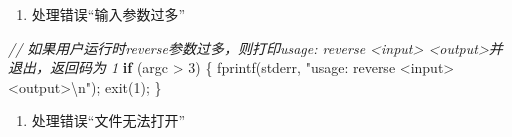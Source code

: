 \documentclass[
]{article}
\newenvironment{Shaded}{}{}
\newcommand{\CommentTok}[1]{\textcolor[rgb]{0.38,0.63,0.69}{\textit{#1}}}
\newcommand{\ControlFlowTok}[1]{\textcolor[rgb]{0.00,0.44,0.13}{\textbf{#1}}}
\newcommand{\DecValTok}[1]{\textcolor[rgb]{0.25,0.63,0.44}{#1}}
\newcommand{\NormalTok}[1]{#1}
\newcommand{\OperatorTok}[1]{\textcolor[rgb]{0.40,0.40,0.40}{#1}}
\newcommand{\SpecialCharTok}[1]{\textcolor[rgb]{0.25,0.44,0.63}{#1}}
\newcommand{\StringTok}[1]{\textcolor[rgb]{0.25,0.44,0.63}{#1}}
\begin{document}
\begin{enumerate}
	\def\labelenumi{\arabic{enumi}.}
	\item
	      处理错误``输入参数过多''
\end{enumerate}

\begin{Shaded}
	\begin{Highlighting}[]
		\CommentTok{// 如果用户运行时reverse参数过多，则打印usage: reverse \textless{}input\textgreater{} \textless{}output\textgreater{}并退出，返回码为 1}
		\ControlFlowTok{if} \OperatorTok{(}\NormalTok{argc }\OperatorTok{\textgreater{}} \DecValTok{3}\OperatorTok{)} \OperatorTok{\{}
		\NormalTok{    fprintf}\OperatorTok{(}\NormalTok{stderr}\OperatorTok{,} \StringTok{"usage: reverse \textless{}input\textgreater{} \textless{}output\textgreater{}}\SpecialCharTok{\textbackslash{}n}\StringTok{"}\OperatorTok{);}
		\NormalTok{    exit}\OperatorTok{(}\DecValTok{1}\OperatorTok{);}
		\OperatorTok{\}}
	\end{Highlighting}
\end{Shaded}

\begin{enumerate}[resume]
	\def\labelenumi{\arabic{enumi}.}
	\item
	      处理错误``文件无法打开''
\end{enumerate}
\end{document}
